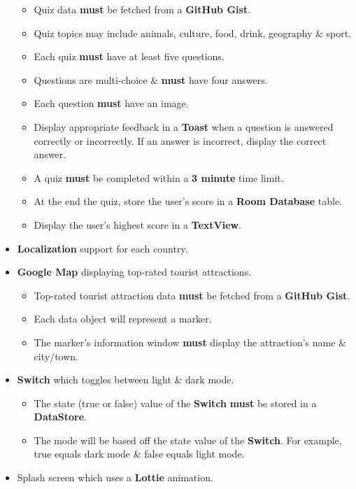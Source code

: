 \documentclass{article}
\begin{document}
\begin{itemize}
	      \begin{itemize}
	      	\item Quiz data \textbf{must} be fetched from a \textbf{GitHub Gist}.
	      	\item Quiz topics may include animals, culture, food, drink, geography \& sport.
	      	\item Each quiz \textbf{must} have at least five questions.
	      	\item Questions are multi-choice \& \textbf{must} have four answers.
	      	\item Each question \textbf{must} have an image.
	      	\item Display appropriate feedback in a \textbf{Toast} when a question is answered correctly or incorrectly. If an answer is incorrect, display the correct answer.
	      	\item A quiz \textbf{must} be completed within a \textbf{3 minute} time limit.
	      	\item At the end the quiz, store the user's score in a \textbf{Room Database} table.
	      	\item Display the user's highest score in a \textbf{TextView}.
	      \end{itemize}
	\item \textbf{Localization} support for each country.
	\item \textbf{Google Map} displaying top-rated tourist attractions. 
	      \begin{itemize}
	      	\item Top-rated tourist attraction data \textbf{must} be fetched from a \textbf{GitHub Gist}.
	      	\item Each data object will represent a marker.
	      	\item The marker's information window \textbf{must} display the attraction's name \& city/town.
	      \end{itemize}
	\item \textbf{Switch} which toggles between light \& dark mode.
	      \begin{itemize}
	      	\item The state (true or false) value of the \textbf{Switch} \textbf{must} be stored in a \textbf{DataStore}.
	      	\item The mode will be based off the state value of the \textbf{Switch}. For example, true equals dark mode \& false equals light mode.
	      \end{itemize}
	\item Splash screen which uses a \textbf{Lottie} animation.

\end{itemize}
\end{document}
